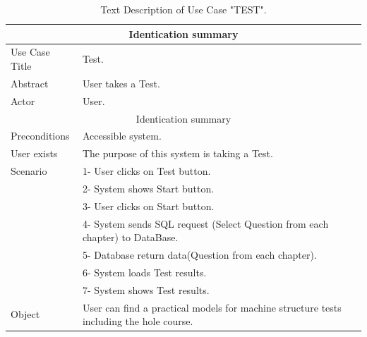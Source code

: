 \begin{table}[h!]
	\begin{center}
		\begin{tabular}{ |p{3cm}|p{9cm}|  }
			\hline
			\multicolumn{2}{|c|}{Identication summary} \\
			\hline
			Use Case Title & Test. \\
			\hline
			Abstract   & User takes a Test. \\
		   \hline
			Actor&  User. \\
		   \hline
		   \multicolumn{2}{|c|}{Identication summary} \\
		   \hline
		   Preconditions & Accessible system.  \\
		   \hline
		   User exists    &  The purpose of this system is taking a Test. \\
		   \hline
		   Scenario &  1- User clicks on Test button. \\ & 2- System shows Start button. \\ & 3- User clicks on Start button. \\ & 4- System sends SQL request (Select Question from each chapter) to DataBase. \\ & 5- Database return data(Question from each chapter).\\ & 6- System loads Test results.\\ & 7- System shows Test results.\\
		   \hline
		   Object&  User can find a practical models for machine structure tests including the hole course. \\
			\hline
\end{tabular}
\end{center}
\caption{Text Description of Use Case "TEST".}
\label{tab:DS TEST}
\end{table}



